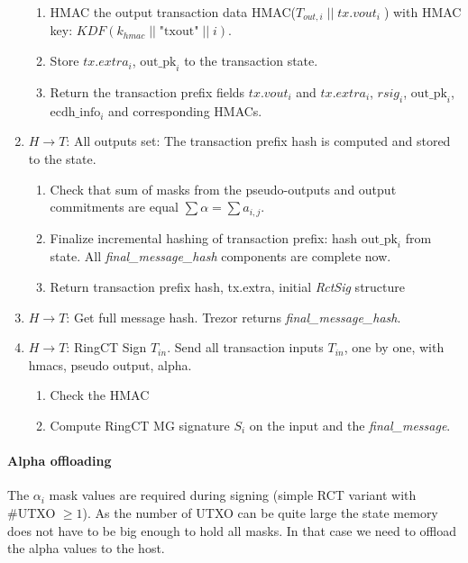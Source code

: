 \documentclass[]{article}
\begin{document}
\begin{enumerate}
\begin{enumerate}
        \item HMAC the output transaction data HMAC($T_{out,i} \; || \; tx.vout_i \; $) with HMAC key: $\textit{KDF}(k_{hmac} \; || \; \text{"txout"} \; || \; i)$.
                
        \item Store $tx.extra_i$, $\text{out\_pk}_i$ to the transaction state.
        
		\item Return the transaction prefix fields $tx.vout_i$ and $tx.extra_i$, $rsig_i$, $\text{out\_pk}_i$, $\text{ecdh\_info}_i$ and corresponding HMACs.
		
	\end{enumerate}
	  
	\item $H \rightarrow T$: All outputs set: The transaction prefix hash is computed and stored to the state. 
	
	\begin{enumerate}
		\item Check that sum of masks from the pseudo-outputs and output commitments are equal $\sum \alpha = \sum a_{i,j}$.
		
		\item Finalize incremental hashing of transaction prefix: hash $\text{out\_pk}_i$ from state. All \emph{final\_message\_hash} components are complete now. 
		
		\item Return transaction prefix hash, tx.extra, initial \emph{RctSig} structure
	\end{enumerate} 

	\item $H \rightarrow T$: Get full message hash. Trezor returns \emph{final\_message\_hash}.
	
	\item $H \rightarrow T$: RingCT Sign $T_{in}$. Send all transaction inputs $T_{in}$, one by one, with hmacs, pseudo output, alpha.
	\begin{enumerate}
		\item Check the HMAC
		
		\item Compute RingCT MG signature $S_i$ on the input and the \emph{final\_message}.
		
	\end{enumerate} 
	
\end{enumerate}

\paragraph{Alpha offloading}
The $\alpha_i$ mask values are required during signing (simple RCT variant with \#UTXO $\ge 1$). As the number of UTXO can be quite large the state memory does not have to be big enough to hold all masks. In that case we need to offload the alpha values to the host. 
\end{document}

